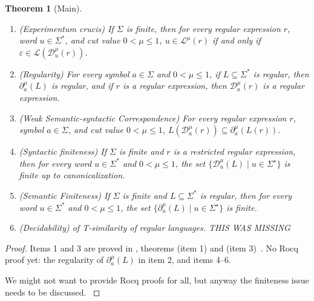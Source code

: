 \documentclass{article}
\newtheorem{theorem}{Theorem}[section]
\begin{document}
\begin{theorem}[Main]\label{the:fuzzyderivative}\hfill \begin{enumerate}
\item (Experimentum crucis) If $\Sigma$ is finite, then for every regular expression $r$, word $u\in \Sigma^\ast$, and cut value
$0<\mu\le1$, $ u\in \mathcal L^\mu(r)$ if and only if $\varepsilon \in \mathcal L(
\mathcal D_u^\mu(r)).
$
\item (Regularity) For every symbol $a\in\Sigma$ and $0<\mu\le1$, if $L\subseteq\Sigma^\ast$ is regular, then
$\partial_a^\mu(L)$ is regular, and if $r$ is a regular expression, then $\mathcal D_a^\mu(r)$ is a regular expression.
\item \label{weak}(Weak Semantic-syntactic Correspondence) For every regular expression $r$, symbol \mbox{$a\in\Sigma$}, and cut value
$0<\mu\le1$, $
L(\mathcal D_a^\mu(r))
\subseteq
\partial_a^\mu(L(r)).
$
\item (Syntactic finiteness) If $\Sigma$ is finite and $r$ is a restricted regular expression, then for every word $u\in \Sigma^\ast$ and $0<\mu\le1$, the set
$
\{\mathcal D_u^\mu(L)\mid u\in\Sigma^\star\}$ is finite up to canonicalization.
\item (Semantic Finiteness) If $\Sigma$ is finite and $L\subseteq\Sigma^\ast$ is regular, then for every word $u\in \Sigma^\ast$ and $0<\mu\le1$, the set
$
\{\partial_u^\mu(L)\mid u\in \Sigma^\star\}
$
is finite. 
\item (Decidability) of T-similarity of regular languages.
{\color{red} THIS WAS MISSING}
\end{enumerate}
\end{theorem}
\begin{proof}
\begin{sloppypar}\raggedright
Items 1 and 3 are proved in , theorems
 (item 1) and 
(item 3)~\cite{OurRocqRepo}.
{\color{red} No Rocq proof yet: the regularity of $\partial_a^\mu(L)$ in item 2, and items 4--6.}
\end{sloppypar}
{\color{red} We might not want to provide Rocq proofs for all, but anyway the finiteness issue needs to be discussed. }
\end{proof}
\end{document}
